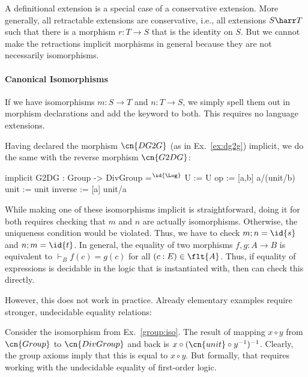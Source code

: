\begin{remark}
A definitional extension is a special case of a conservative extension.
More generally, all retractable extensions are conservative, i.e., all extensions $S\harr T$ such that there is a morphism $r:T\to S$ that is the identity on $S$.
But we cannot make the retractions implicit morphisms in general because they are not necessarily isomorphisms.
\end{remark}

\paragraph{Canonical Isomorphisms}
If we have isomorphisms $m:S\to T$ and $n:T\to S$, we simply spell them out in morphism declarations and add the keyword  to both.
This requires no language extensions.

\begin{example}\label{group:iso}
Having declared the morphism $\cn{DG2G}$ (as in Ex.~\ref{ex:dg2g}) implicit, we do the same with the reverse morphism  $\cn{G2DG}$:
\begin{mmtcode}
implicit G2DG : Group -> DivGroup =$^{\id{\Log}}$
  U       := U
  op      := [a,b] a/(unit/b) 
  unit    := unit
  inverse := [a] unit/a
\end{mmtcode}
\end{example}

While making one of these isomorphisms implicit is straightforward, doing it for both requires checking that $m$ and $n$ are actually isomorphisms.
Otherwise, the uniqueness condition would be violated.
Thus, we have to check $m;n=\id{s}$ and $n;m=\id{t}$.
In general, the equality of two morphisms $f,g:A\to B$ is equivalent to $\vdash_B f(c)=g(c)$ for all $(c:E)\in\flt{A}$.
Thus, if equality of expressions is decidable in the logic that \mmt is instantiated with, then \mmt can check this directly.

However, this does not work in practice.
Already elementary examples require stronger, undecidable equality relations:

\begin{example}
Consider the isomorphism from Ex.~\ref{group:iso}.
The result of mapping $x\circ y$ from $\cn{Group}$ to $\cn{DivGroup}$ and back is $x\circ(\cn{unit}\circ y^{-1})^{-1}$.
Clearly, the group axioms imply that this is equal to $x\circ y$.
But formally, that requires working with the undecidable equality of first-order logic.
\end{example}


